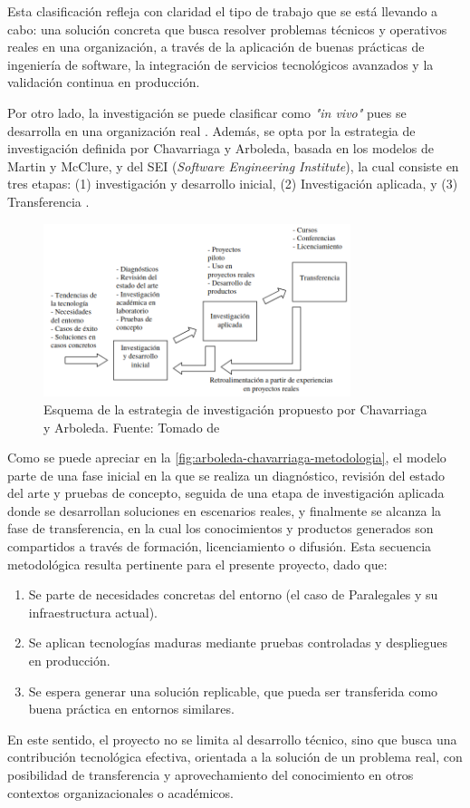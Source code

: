 Esta clasificación refleja con claridad el tipo de trabajo que se está llevando a cabo: una solución concreta que busca resolver problemas técnicos y operativos reales en una organización, a través de la aplicación de buenas prácticas de ingeniería de software, la integración de servicios tecnológicos avanzados y la validación continua en producción.

Por otro lado, la investigación se puede clasificar como \textit{"in vivo"} pues se desarrolla en una organización real \cite{ChavarriagaLIDIS}. Además, se opta por la estrategia de investigación definida por Chavarriaga y Arboleda, basada en los modelos de Martin y McClure, y del SEI (\textit{Software Engineering Institute}), la cual consiste en tres etapas: (1) investigación y desarrollo inicial, (2) Investigación aplicada, y (3) Transferencia \cite{ChavarriagaLIDIS,ChavarriagaModelo}.

\begin{figure}[H]
  \centering
  \includegraphics[width=0.8\textwidth]{img/figures/fig9-chavarriaga-arboleda.png}
  \caption{Esquema de la estrategia de investigación propuesto por Chavarriaga y Arboleda. Fuente: Tomado de \cite{ChavarriagaLIDIS}}
  \label{fig:arboleda-chavarriaga-metodologia}
\end{figure}

Como se puede apreciar en la \autoref{fig:arboleda-chavarriaga-metodologia}, el modelo parte de una fase inicial en la que se realiza un diagnóstico, revisión del estado del arte y pruebas de concepto, seguida de una etapa de investigación aplicada donde se desarrollan soluciones en escenarios reales, y finalmente se alcanza la fase de transferencia, en la cual los conocimientos y productos generados son compartidos a través de formación, licenciamiento o difusión. Esta secuencia metodológica resulta pertinente para el presente proyecto, dado que:

\begin{enumerate}
  \item Se parte de necesidades concretas del entorno (el caso de Paralegales y su infraestructura actual).
  \item Se aplican tecnologías maduras mediante pruebas controladas y despliegues en producción.
  \item Se espera generar una solución replicable, que pueda ser transferida como buena práctica en entornos similares.
\end{enumerate}

En este sentido, el proyecto no se limita al desarrollo técnico, sino que busca una contribución tecnológica efectiva, orientada a la solución de un problema real, con posibilidad de transferencia y aprovechamiento del conocimiento en otros contextos organizacionales o académicos.

